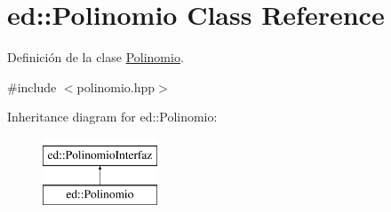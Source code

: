 \hypertarget{classed_1_1Polinomio}{\section{ed\-:\-:Polinomio Class Reference}
\label{classed_1_1Polinomio}
}


Definición de la clase \hyperlink{classed_1_1Polinomio}{Polinomio}.  




{\ttfamily \#include $<$polinomio.\-hpp$>$}

Inheritance diagram for ed\-:\-:Polinomio\-:\begin{figure}[H]
\begin{center}
\leavevmode
\includegraphics[height=2.000000cm]{classed_1_1Polinomio}
\end{center}
\end{figure}
